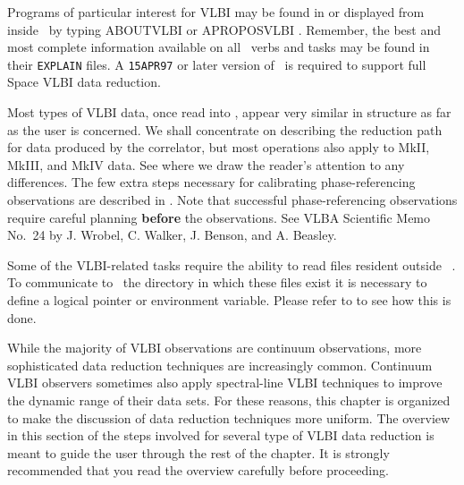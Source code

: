 Programs of particular interest for VLBI may be found in 
or displayed from inside \AIPS\ by typing {\us ABOUT\qs VLBI\CR} or
{\us APROPOS\qs VLBI \CR}\@.  Remember, the best and most complete
information available on all \AIPS\ verbs and tasks may be found in
their {\tt EXPLAIN} files.  A {\tt 15APR97} or later version of \AIPS\
is required to support full Space VLBI data reduction.

Most types of VLBI data, once read into \AIPS, appear very similar in
structure as far as the user is concerned.  We shall concentrate on
describing the reduction path for data produced by the \Indx{VLBA}
correlator, but most operations also apply to MkII, MkIII, and MkIV
data.  See \Sec{oldvlb} where we draw the reader's attention to any
differences.  The few extra steps necessary for calibrating
phase-referencing observations are described in .
Note that successful phase-referencing observations require careful
planning {\bf before} the observations.  See VLBA Scientific Memo
No.~24 by J. Wrobel, C. Walker, J. Benson, and A. Beasley.

Some of the VLBI-related tasks require the ability to read files
resident outside \AIPS\ .  To communicate to \AIPS\ the directory in
which these files exist it is necessary to define a logical pointer or
environment variable.  Please refer to \Sec{externfile} to see how
this is done.

While the majority of VLBI observations are continuum observations,
more sophisticated data reduction techniques are increasingly common.
Continuum VLBI observers sometimes also apply spectral-line VLBI
techniques to improve the dynamic range of their data sets.  For these
reasons, this chapter is organized to make the discussion of data
reduction techniques more uniform.  The overview in this section of
the steps involved for several type of VLBI data reduction is meant to
guide the user through the rest of the chapter.  It is strongly
recommended that you read the overview carefully before proceeding.

